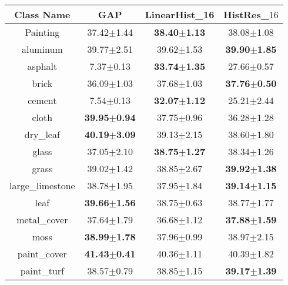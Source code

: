 \documentclass[journal]{IEEEtai}
\begin{document}
\begin{table*}[h]
		\begin{subtable}[htb]{.49\textwidth}
			\centering
        \begin{tabular}{|c|c|c|c|}
            \hline
            Class Name       & GAP  & LinearHist\_16 & HistRes\_$16$  \\ \hline
            Painting         & 37.42$\pm$1.44 & \textbf{38.40$\pm$1.13} & {38.08$\pm$1.08}               \\ \hline
            aluminum         & 39.77$\pm$2.51  & 39.62$\pm$1.53& \textbf{39.90$\pm$1.85}                \\ \hline
            asphalt          & 7.37$\pm$0.13 & \textbf{33.74$\pm$1.35}& {27.66$\pm$0.57}               \\ \hline
            brick            & 36.09$\pm$1.03 & 37.68$\pm$1.03 & \textbf{37.76$\pm$0.50}                \\ \hline
            cement           & 7.54$\pm$0.13 & \textbf{32.07$\pm$1.12} & {25.21$\pm$2.44}               \\ \hline
            cloth            & \textbf{39.95$\pm$0.94} &37.75$\pm$0.96 & 36.28$\pm$1.28                        \\ \hline
            dry\_leaf        & \textbf{40.19$\pm$3.09} &39.13$\pm$2.15 & 38.60$\pm$1.80                          \\ \hline
            glass            & 37.05$\pm$2.10  & \textbf{38.75$\pm$1.27} & {38.34$\pm$1.26}               \\ \hline
            grass            & 39.02$\pm$1.42  &38.85$\pm$2.67 & \textbf{39.92$\pm$1.38}               \\ \hline
            large\_limestone & 38.78$\pm$1.95  &37.95$\pm$1.84 & \textbf{39.14$\pm$1.15}               \\ \hline
            leaf             & \textbf{39.66$\pm$1.56} &38.75$\pm$0.63 & 38.77$\pm$1.77                        \\ \hline
            metal\_cover     & 37.64$\pm$1.79  &36.68$\pm$1.12 & \textbf{37.88$\pm$1.59}               \\ \hline
            moss             & \textbf{38.99$\pm$1.78} &37.96$\pm$0.99 & 38.97$\pm$2.15                        \\ \hline
            paint\_cover     & \textbf{41.43$\pm$0.41}  &40.36$\pm$1.11 & 40.39$\pm$1.82                        \\ \hline
            paint\_turf      & 38.57$\pm$0.79  &38.85$\pm$1.15    & \textbf{39.17$\pm$1.39}               \\ \hline

\end{tabular}
\end{subtable}
\end{table*}
\end{document}
